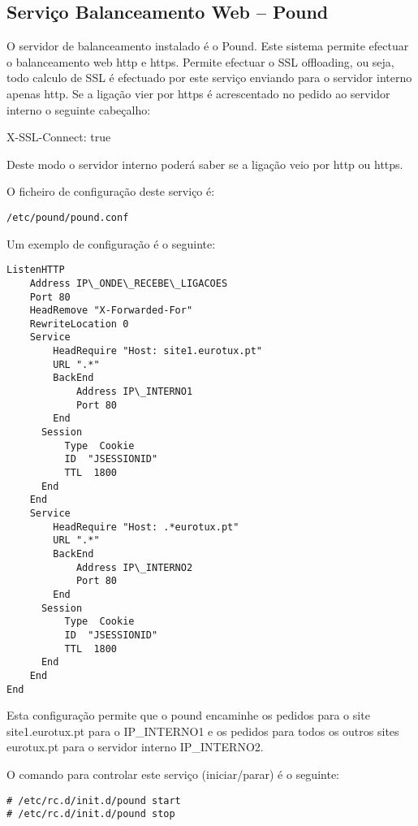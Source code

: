 \subsection{Serviço Balanceamento Web -- Pound}

O servidor de balanceamento instalado é o Pound. Este sistema permite efectuar o balanceamento web http e https. Permite efectuar o SSL offloading, ou seja, todo calculo de SSL é efectuado por este serviço enviando para o servidor interno apenas http. Se a ligação vier por https é acrescentado no pedido ao servidor interno o seguinte cabeçalho:

X-SSL-Connect: true

Deste modo o servidor interno poderá saber se a ligação veio por http ou https.

O ficheiro de configuração deste serviço é:

\begin{Verbatim}[commandchars=\\\{\}]
/etc/pound/pound.conf
\end{Verbatim}

Um exemplo de configuração é o seguinte:

\begin{Verbatim}[commandchars=\\\{\}]
ListenHTTP
    Address IP\_ONDE\_RECEBE\_LIGACOES
    Port 80
    HeadRemove "X-Forwarded-For"
    RewriteLocation 0
    Service
        HeadRequire "Host: site1.eurotux.pt"
        URL ".*"
        BackEnd
            Address IP\_INTERNO1
            Port 80
        End
      Session
          Type  Cookie
          ID  "JSESSIONID"
          TTL  1800
      End
    End
    Service
        HeadRequire "Host: .*eurotux.pt"
        URL ".*"
        BackEnd
            Address IP\_INTERNO2
            Port 80
        End
      Session
          Type  Cookie
          ID  "JSESSIONID"
          TTL  1800
      End
    End
End
\end{Verbatim}

Esta configuração permite que o pound encaminhe os pedidos para o site site1.eurotux.pt para o IP\_INTERNO1 e os pedidos para todos os outros sites eurotux.pt para o servidor interno IP\_INTERNO2.

O comando para controlar este serviço (iniciar/parar) é o seguinte:

\begin{Verbatim}[commandchars=\\\{\}]
# /etc/rc.d/init.d/pound start
# /etc/rc.d/init.d/pound stop
\end{Verbatim}

